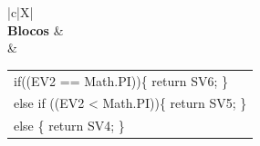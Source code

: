 \begin{xltabular}{\textwidth}{|c|X|}
 \\ \hline
\textbf{Blocos} &  \\ \hline
{} & \begin{tabular}[c]{@{}l@{}}if((EV2 == Math.PI))\{   return SV6; \}\\ else if ((EV2 < Math.PI))\{   return SV5; \}\\ else \{   return SV4; \} \end{tabular}  \\ \hline
	

\end{xltabular}

